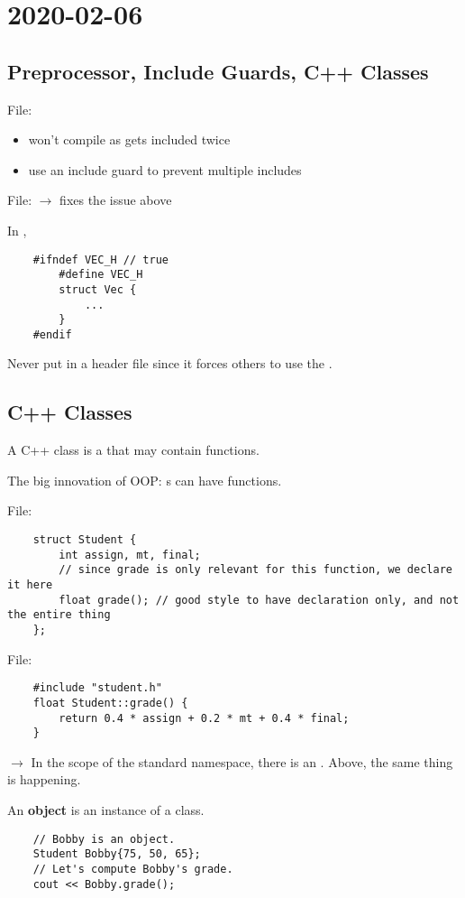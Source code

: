 \section{2020-02-06}
\subsection{Preprocessor, Include Guards, C++ Classes}
File: 
\begin{itemize}
      \item won't compile as  gets included twice
      \item use an include guard to prevent multiple includes
\end{itemize}
File:  $ \rightarrow $ fixes the issue above

In ,
\begin{lstlisting}
    #ifndef VEC_H // true
        #define VEC_H
        struct Vec {
            ...
        }
    #endif
\end{lstlisting}
Never put  in a header file since it forces
others to use the .

\subsection{C++ Classes}
A C++ class is a  that may contain functions.

The big innovation of OOP\@: s can have functions.

File: 
\begin{lstlisting}
    struct Student {
        int assign, mt, final;
        // since grade is only relevant for this function, we declare it here
        float grade(); // good style to have declaration only, and not the entire thing
    };
\end{lstlisting}

File: 
\begin{lstlisting}
    #include "student.h"
    float Student::grade() {
        return 0.4 * assign + 0.2 * mt + 0.4 * final;
    }
\end{lstlisting}
 $ \rightarrow $
In the scope of the standard namespace, there is an .
Above, the same thing is happening.

An \textbf{object} is an instance of a class.
\begin{lstlisting}
    // Bobby is an object.
    Student Bobby{75, 50, 65};
    // Let's compute Bobby's grade.
    cout << Bobby.grade();
\end{lstlisting}

